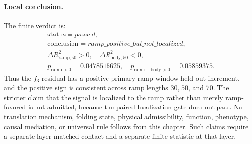 \paragraph{Local conclusion.}
The finite verdict is:
$$
\begin{aligned}
&\mathrm{status} = passed,\\
&\mathrm{conclusion} = ramp\_positive\_but\_not\_localized,\\
&\Delta R^2_{\mathrm{ramp},50} > 0,\quad \Delta R^2_{\mathrm{body},50} < 0,\\
&p_{\mathrm{ramp}>0}=0.0478515625,\quad p_{\mathrm{ramp-body}>0}=0.05859375.
\end{aligned}
$$
Thus the $f_3$ residual has a positive primary ramp-window held-out increment, and the positive sign is consistent across ramp lengths $30$, $50$, and $70$. The stricter claim that the signal is localized to the ramp rather than merely ramp-favored is not admitted, because the paired localization gate does not pass. No translation mechanism, folding state, physical admissibility, function, phenotype, causal mediation, or universal rule follows from this chapter. Such claims require a separate layer-matched contact and a separate finite statistic at that layer.